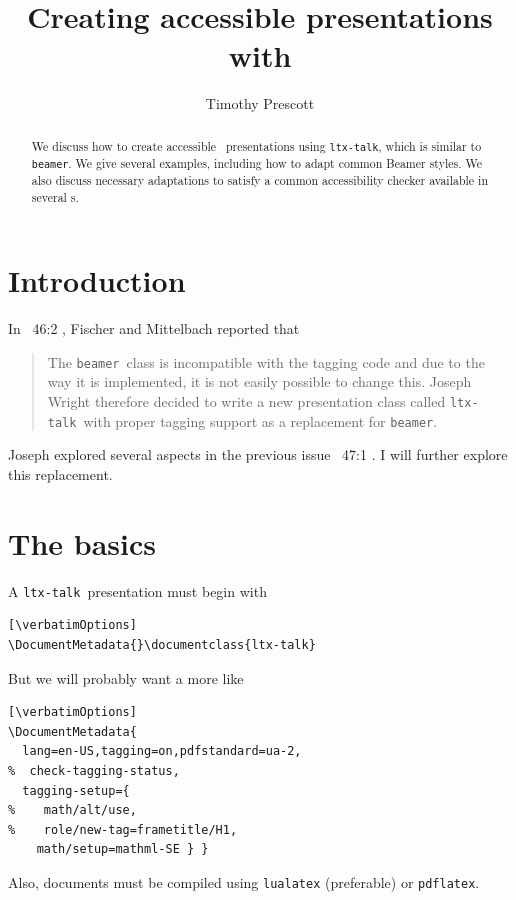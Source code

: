 \documentclass{ltugboat}
\title{Creating accessible presentations with \ltxtalk}
\author{Timothy Prescott}
\newcommand{\verbatimOptions}{%
 \IfDocumentMetadataT{setup-code=}\small\makevmeta}
\newcommand{\beamer}{\texttt{beamer}}
\newcommand{\ltxtalk}{\texttt{ltx-talk}}
\begin{document}
\maketitle


\begin{abstract}
We discuss how to create accessible \PDF\ presentations
using \texttt{ltx-talk}, which is similar to \texttt{beamer}.
We give several examples, including how to adapt common Beamer styles.
We also discuss necessary adaptations
to satisfy a common accessibility checker available in several s.
\end{abstract}

\section{Introduction}

In \TUB\ 46:2 \cite{Fischer:2025:NLT}, Fischer and Mittelbach reported that
\begin{quote}
The \beamer\ class is incompatible with the tagging
code and due to the way it is implemented, it is
not easily possible to change this. Joseph Wright
therefore decided to write a new presentation class
called \ltxtalk\ with proper tagging support as a
replacement for \beamer.
\end{quote}
Joseph explored several aspects in the previous issue
\TUB\ 47:1 \cite{Wright:TB47-1:64}.
I will further explore this replacement.

\section{The basics}

A \ltxtalk\ presentation must begin with
\begin{verbatim}[\verbatimOptions]
\DocumentMetadata{}\documentclass{ltx-talk}
\end{verbatim}
But we will probably want a  more like
\begin{verbatim}[\verbatimOptions]
\DocumentMetadata{
  lang=en-US,tagging=on,pdfstandard=ua-2,
%  check-tagging-status,
  tagging-setup={
%    math/alt/use,
%    role/new-tag=frametitle/H1,
    math/setup=mathml-SE } }
\end{verbatim}
Also, documents must be compiled using \texttt{lualatex} (preferable)
or \texttt{pdflatex}.
\end{document}
